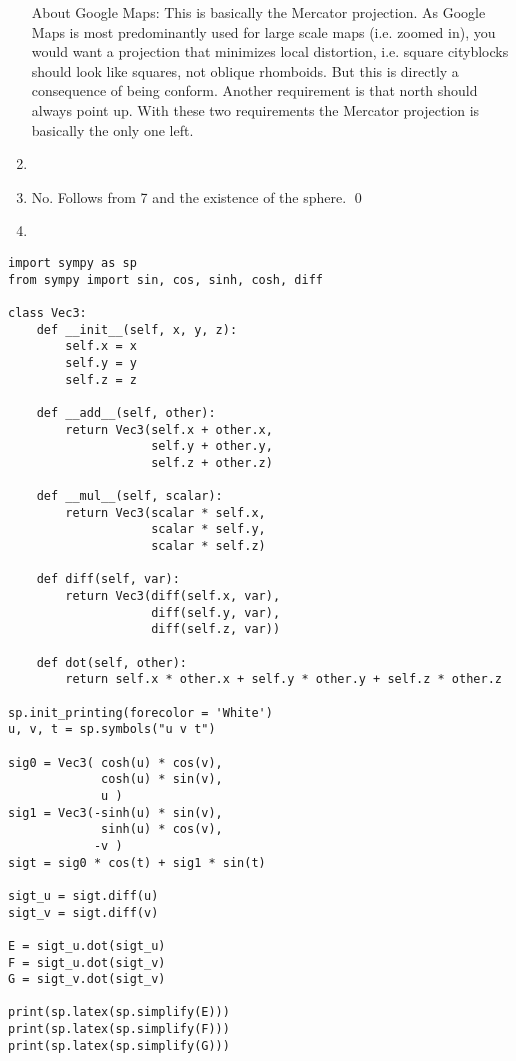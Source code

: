 \documentclass[a4paper,11pt,notitlepage,fullpage]{article}
\begin{document}
\begin{enumerate}
About Google Maps: This is basically the Mercator projection. As Google Maps is most predominantly used for large scale maps (i.e. zoomed in), you would want a projection that minimizes local distortion, i.e. square cityblocks should look like squares, not oblique rhomboids. But this is directly a consequence of being conform. Another requirement is that north should always point up. With these two requirements the Mercator projection is basically the only one left. 

\item 

\item No. Follows from 7 and the existence of the sphere. \qed

\item


\end{enumerate}

\newpage

\begin{verbatim}
import sympy as sp
from sympy import sin, cos, sinh, cosh, diff

class Vec3:
    def __init__(self, x, y, z):
        self.x = x
        self.y = y
        self.z = z

    def __add__(self, other):
        return Vec3(self.x + other.x,
                    self.y + other.y,
                    self.z + other.z)
        
    def __mul__(self, scalar):
        return Vec3(scalar * self.x,
                    scalar * self.y,
                    scalar * self.z)

    def diff(self, var):
        return Vec3(diff(self.x, var),
                    diff(self.y, var),
                    diff(self.z, var))
        
    def dot(self, other):
        return self.x * other.x + self.y * other.y + self.z * other.z

sp.init_printing(forecolor = 'White')
u, v, t = sp.symbols("u v t")

sig0 = Vec3( cosh(u) * cos(v),
             cosh(u) * sin(v),
             u )
sig1 = Vec3(-sinh(u) * sin(v),
             sinh(u) * cos(v),
            -v )
sigt = sig0 * cos(t) + sig1 * sin(t)

sigt_u = sigt.diff(u)
sigt_v = sigt.diff(v)

E = sigt_u.dot(sigt_u)
F = sigt_u.dot(sigt_v)
G = sigt_v.dot(sigt_v)

print(sp.latex(sp.simplify(E)))
print(sp.latex(sp.simplify(F)))
print(sp.latex(sp.simplify(G)))
\end{verbatim}
\end{document}
